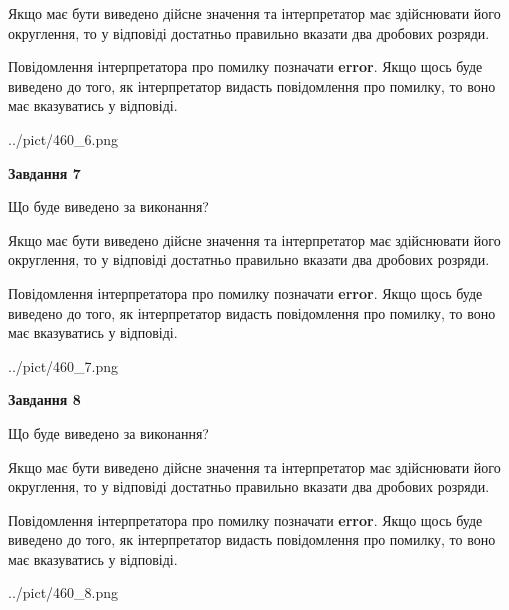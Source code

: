 \documentclass[12pt, ukrainian]{article}
\begin{document}
{\begin {Large}
Якщо має бути виведено дійсне значення та інтерпретатор має здійснювати його округлення, 
то у відповіді достатньо правильно вказати два дробових розряди.

Повідомлення інтерпретатора про помилку позначати \textbf{error}.
Якщо щось буде виведено до того, як інтерпретатор видасть повідомлення про помилку, 
то воно має вказуватись у відповіді. \par

\begin{center}
	{../pict/460_6.png}
\end{center}
\newpage

{\begin {center}\textbf{Завдання 7}\end {center}}\par
Що буде виведено за виконання? \par

Якщо має бути виведено дійсне значення та інтерпретатор має здійснювати його округлення, 
то у відповіді достатньо правильно вказати два дробових розряди.

Повідомлення інтерпретатора про помилку позначати \textbf{error}.
Якщо щось буде виведено до того, як інтерпретатор видасть повідомлення про помилку, 
то воно має вказуватись у відповіді. \par

\begin{center}
	{../pict/460_7.png}
\end{center}
\newpage

{\begin {center}\textbf{Завдання 8}\end {center}}\par
Що буде виведено за виконання? \par

Якщо має бути виведено дійсне значення та інтерпретатор має здійснювати його округлення, 
то у відповіді достатньо правильно вказати два дробових розряди.

Повідомлення інтерпретатора про помилку позначати \textbf{error}.
Якщо щось буде виведено до того, як інтерпретатор видасть повідомлення про помилку, 
то воно має вказуватись у відповіді. \par

\begin{center}
	{../pict/460_8.png}
\end{center}
\newpage


\end{Large}}
\end{document}
